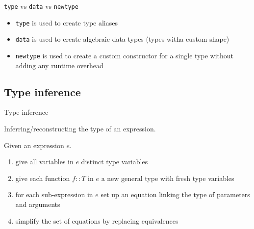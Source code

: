 \documentclass{beamer}
\def\code#1{\texttt{\frenchspacing#1}}
\begin{document}
\begin{frame}{\code{type} vs \code{data} vs \code{newtype}}

\begin{itemize}
    \item \code{type} is used to create type aliases\pause
    \item \code{data} is used to create algebraic data types (types witha custom shape)\pause
    \item \code{newtype} is used to create a custom constructor for a single type without adding any runtime overhead
\end{itemize}

\end{frame}

\subsection{Type inference}

\begin{frame}{Type inference}

\begin{block}{\centering Inferring/reconstructing the type of an expression.}
\end{block}

\pause

Given an expression $e$.\pause
\begin{enumerate}
    \item give all variables in $e$ distinct type variables\pause
    \item give each function $f :: T$ in $e$ a new general type with fresh type variables\pause
    \item for each sub-expression in $e$ set up an equation linking the type of parameters and arguments\pause
    \item simplify the set of equations by replacing equivalences
\end{enumerate}

\end{frame}
\end{document}
